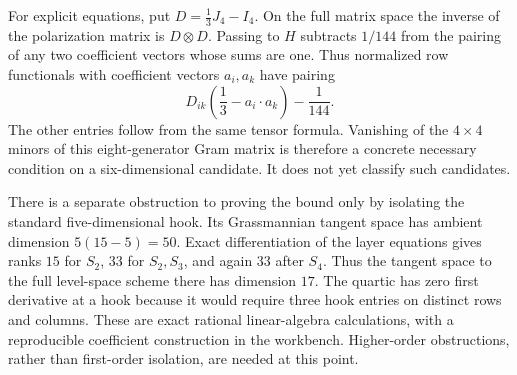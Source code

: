 For explicit equations, put $D=\frac13J_4-I_4$.  On the full matrix space the
inverse of the polarization matrix is $D\otimes D$.  Passing to $H$ subtracts
$1/144$ from the pairing of any two coefficient vectors whose sums are one.
Thus normalized row functionals with coefficient vectors $a_i,a_k$ have pairing
\[
 D_{ik}\left(\frac13-a_i\cdot a_k\right)-\frac1{144}.
\]
The other entries follow from the same tensor formula.  Vanishing of the
$4\times4$ minors of this eight-generator Gram matrix is therefore a concrete
necessary condition on a six-dimensional candidate.  It does not yet classify
such candidates.

There is a separate obstruction to proving the bound only by isolating the
standard five-dimensional hook.  Its Grassmannian tangent space has ambient
dimension $5(15-5)=50$.  Exact differentiation of the layer equations gives ranks
$15$ for $S_2$, $33$ for $S_2,S_3$, and again $33$ after $S_4$.  Thus the tangent
space to the full level-space scheme there has dimension $17$.  The quartic has
zero first derivative at a hook because it would require three hook entries on
distinct rows and columns.  These are exact rational linear-algebra calculations,
with a reproducible coefficient construction in the workbench.  Higher-order
obstructions, rather than first-order isolation, are needed at this point.

